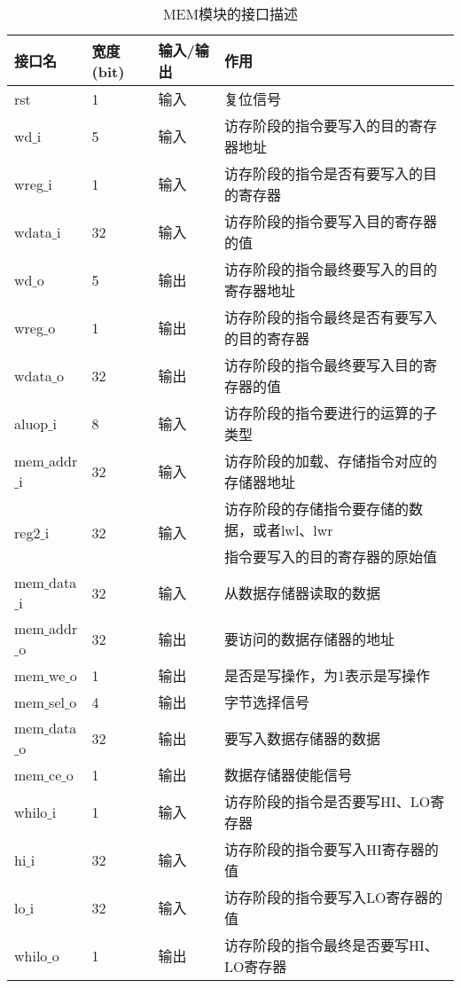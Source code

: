 \quad
\begin{table}[H]
	\centering
	\caption{MEM模块的接口描述}
	\begin{tabular}{|l|l|l|l|}
		\hline
		接口名 & 宽度(bit) & 输入/输出 & 作用 \\
		\hline
		rst & 1 & 输入 & 复位信号 \\
		\hline
		wd$\_$i & 5 & 输入 & 访存阶段的指令要写入的目的寄存器地址 \\
		\hline
		wreg$\_$i & 1 & 输入 & 访存阶段的指令是否有要写入的目的寄存器 \\
		\hline
		wdata$\_$i & 32 & 输入 & 访存阶段的指令要写入目的寄存器的值 \\
		\hline
		wd$\_$o & 5 & 输出 & 访存阶段的指令最终要写入的目的寄存器地址 \\
		\hline
		wreg$\_$o & 1 & 输出 & 访存阶段的指令最终是否有要写入的目的寄存器 \\
		\hline
		wdata$\_$o & 32 & 输出 & 访存阶段的指令最终要写入目的寄存器的值 \\
		\hline
		aluop$\_$i & 8 & 输入 & 访存阶段的指令要进行的运算的子类型 \\
		\hline
		mem$\_$addr$\_$i & 32 & 输入 & 访存阶段的加载、存储指令对应的存储器地址 \\
		\hline
		\multirow{2}{*}{reg2$\_$i} & \multirow{2}{*}{32} & \multirow{2}{*}{输入} & 访存阶段的存储指令要存储的数据，或者lwl、lwr \\
		& & & 指令要写入的目的寄存器的原始值 \\
		\hline
		mem$\_$data$\_$i & 32 & 输入 & 从数据存储器读取的数据 \\
		\hline
		mem$\_$addr$\_$o & 32 & 输出 & 要访问的数据存储器的地址 \\
		\hline
		mem$\_$we$\_$o & 1 & 输出 & 是否是写操作，为1表示是写操作 \\
		\hline
		mem$\_$sel$\_$o & 4 & 输出 & 字节选择信号 \\
		\hline
		mem$\_$data$\_$o & 32 & 输出 & 要写入数据存储器的数据 \\
		\hline
		mem$\_$ce$\_$o & 1 & 输出 & 数据存储器使能信号 \\
		\hline
		whilo$\_$i & 1 & 输入 & 访存阶段的指令是否要写HI、LO寄存器 \\
		\hline
		hi$\_$i & 32 & 输入 & 访存阶段的指令要写入HI寄存器的值 \\
		\hline
		lo$\_$i & 32 & 输入 & 访存阶段的指令要写入LO寄存器的值 \\
		\hline
		whilo$\_$o & 1 & 输出 & 访存阶段的指令最终是否要写HI、LO寄存器 \\

\end{tabular}
\end{table}
